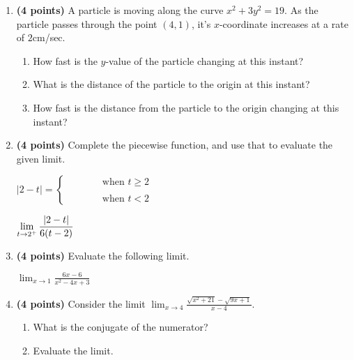 \documentclass[12pt]{amsart}
\begin{document}
\begin{enumerate}
\vspace{2cm}
\newpage\def \b{3}\def \x{4}\def \y{1}\def \xchange{2}\def \ratrhs{4}\def \cirrhs{19}\def \hyprhs{13}\def \compy{3y^{2}}\def \ychangenum{2}\def \dist{17}\def \fracrat{15}\def \fraccirc{\frac{32}{3}}\def \frachyp{\frac{64}{3}}
\item {\bf (4 points)} 
 A particle is moving along the curve $x^2 + \compy = \cirrhs$. As the particle passes through the point $(\x,\y)$, it's $x$-coordinate increases at a rate of $\xchange$cm/sec. \begin{enumerate}
\item How fast is the $y$-value of the particle changing at this instant? \vfill
\item What is the distance of the particle to the origin at this instant? \vfill
\item How fast is the distance from the particle to the origin changing at this instant? \vfill
\end{enumerate}

\newpage\def \a{2}\def \k{6}\def \abstop{1}\def \ktop{0}
\item {\bf (4 points)} 
 Complete the piecewise function, and use that to evaluate the given limit.

\vspace{.5cm}

$|\a - t| = \begin{cases} \hspace{1cm} & \text{ when } t \geq \a \\ & \\ \hspace{1cm} & \text{ when } t < \a \end{cases}$

\vspace{.5cm}

$\displaystyle \lim_{t \rightarrow \a^+} \frac{\ifthenelse{\ktop=1}{\k}{}\ifthenelse{\abstop=1}{|\a-t|}{(t-\a)}}{\ifthenelse{\ktop=0}{\k}{}\ifthenelse{\abstop=0}{|\a-t|}{(t-\a)}}$

\vfill 
\def \a{1}\def \b{3}\def \k{6}\def \fancyp{x^{2}-4x^{}+3}\def \simplep{6x^{}-6}\def \fancyreduced{-2}\def \niceanstop{\frac{-1}{3}}\def \niceansbottom{-3}
\item {\bf (4 points)} 
 Evaluate the following limit. 

$\displaystyle \lim_{x\rightarrow \a} \frac{\simplep}{\fancyp}$

\vfill 
\newpage\def \a{4}\def \b{5}\def \ab{20}\def \c{21}\def \amb{-1}\def \ansroot{37}\def \firstroot{x^{2}+21}\def \secondroot{9x^{}+1}\def \porm{1}
\item {\bf (4 points)} 
 Consider the limit $\displaystyle \lim_{x \rightarrow \a} \frac{\sqrt{\firstroot} - \sqrt{\secondroot}}{x-\a}$. \begin{enumerate}
\item What is the conjugate of the numerator? \vspace{3cm}
\item Evaluate the limit.
\end{enumerate}


\end{enumerate}
\end{document}
